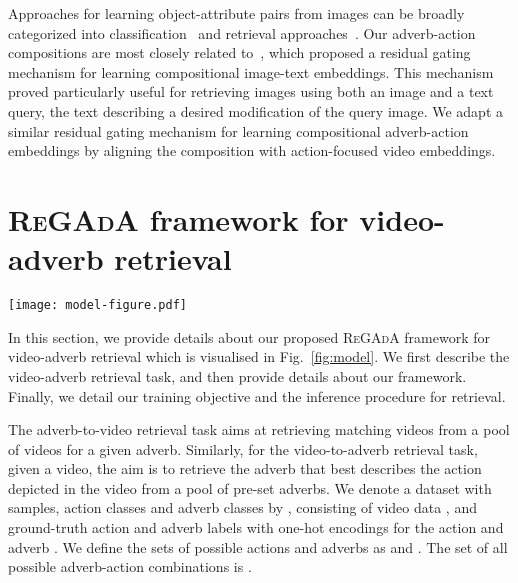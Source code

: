 \documentclass[table]{bmvc2k}
\newcommand{\modelName}{\textsc{ReGAdA}\xspace}
\begin{document}
Approaches for learning object-attribute pairs from images can be broadly categorized into classification~\cite{misra2017red, nagarajan2018attributes, li2020symmetry, mancini2021_compcos, naeem2021_cge} and retrieval approaches~\cite{borth2013large,chen2014inferring,isola2015discovering,nan2019recognizing,wang2013unified,wang2010discriminative,vo2019composing}.
Our adverb-action compositions are most closely related to~\cite{vo2019composing}, which proposed a residual gating mechanism for learning compositional image-text embeddings. This mechanism proved particularly useful for retrieving images using both an image and a text query, the text describing a desired modification of the query image. We adapt a similar residual gating mechanism for learning compositional adverb-action embeddings by aligning the composition with action-focused video embeddings.  

\section{\modelName framework for video-adverb retrieval}
\begin{figure*}
    \begin{center}
    \texttt{[image: model-figure.pdf]} 
    \end{center}
    \caption{\textbf{Overview of our \modelName framework for video-adverb retrieval.} Our framework composes adverb-action embeddings with a gated residual between the adverbs  and the concatenated action and adverb embeddings . The training objective  aligns the learned text and video representations in a joint embedding space. For test time inference, outputs are obtained based on similarity in the embedding space. 
}
    \label{fig:model}
 \vspace{-10pt}
\end{figure*}


In this section, we provide details about our proposed \modelName framework for video-adverb retrieval which is visualised in Fig.~\ref{fig:model}. We first 
describe the video-adverb retrieval task, and then provide details about our framework. Finally, we detail our training objective and the inference procedure for retrieval.

The adverb-to-video retrieval task aims at retrieving matching videos from a pool of videos for a given adverb. Similarly, for the video-to-adverb retrieval task, given a video, the aim is to retrieve the adverb that best describes the action depicted in the video from a pool of pre-set adverbs. 
We denote a dataset with  samples,  action classes and  adverb classes by , consisting of video data , and ground-truth action and adverb labels  with one-hot encodings for the action  and adverb .
We define the sets of possible actions and adverbs as  and . The set of all possible adverb-action combinations is 
.
\end{document}
